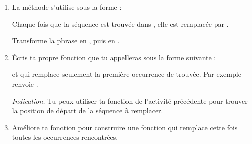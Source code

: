 \documentclass[11pt,class=report,crop=false]{standalone}
\begin{document}

\begin{activite}[Remplacer]


\begin{enumerate}
  \item  La méthode  s'utilise sous la forme :
  
  \centerline{}

	
	Chaque fois que la séquence  est trouvée dans , elle est remplacée par .
	
	Transforme la phrase  en , puis en 
	.
	
	\item Écris ta propre fonction  que tu appelleras sous la forme suivante :
	
  \centerline{}
  
 et qui remplace seulement la première occurrence de  trouvée. Par exemple  renvoie .
  
  
  \emph{Indication.} Tu peux utiliser ta fonction  de l'activité précédente pour trouver la position de départ de la séquence à remplacer.
  
 	\item Améliore ta fonction pour construire une fonction  qui remplace cette fois toutes les occurrences rencontrées.
 	    
\end{enumerate}    
\end{activite}

\end{document}
